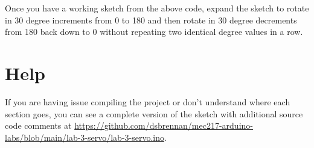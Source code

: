 \documentclass[11pt,a4paper]{article}
\begin{document}
\noindent
Once you have a working sketch from the above code, expand the sketch to rotate in 30 degree increments from 0 to 180 and then rotate in 30 degree decrements from 180 back down to 0 without repeating two identical degree values in a row.

\section*{Help}
If you are having issue compiling the project or don't understand where each section goes, you can see a complete version of the sketch with additional source code comments at \url{https://github.com/dsbrennan/mec217-arduino-labs/blob/main/lab-3-servo/lab-3-servo.ino}.

\vspace{2em}

\begin{center}
\end{center}
\end{document}
